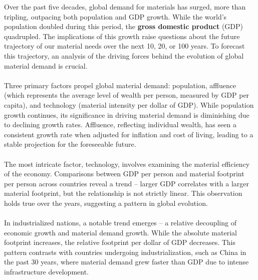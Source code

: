 \documentclass[../summary.tex]{subfiles}
\begin{document}
Over the past five decades, global demand for materials has surged, more than tripling, outpacing both population and GDP growth. While the world's population doubled during this period, the \textbf{gross domestic product} (GDP) quadrupled. The implications of this growth raise questions about the future trajectory of our material needs over the next 10, 20, or 100 years. To forecast this trajectory, an analysis of the driving forces behind the evolution of global material demand is crucial.\\
\\
Three primary factors propel global material demand: population, affluence (which represents the average level of wealth per person, measured by GDP per capita), and technology (material intensity per dollar of GDP). While population growth continues, its significance in driving material demand is diminishing due to declining growth rates. Affluence, reflecting individual wealth, has seen a consistent growth rate when adjusted for inflation and cost of living, leading to a stable projection for the foreseeable future.\\
\\
The most intricate factor, technology, involves examining the material efficiency of the economy. Comparisons between GDP per person and material footprint per person across countries reveal a trend – larger GDP correlates with a larger material footprint, but the relationship is not strictly linear. This observation holds true over the years, suggesting a pattern in global evolution.\\
\\
In industrialized nations, a notable trend emerges – a relative decoupling of economic growth and material demand growth. While the absolute material footprint increases, the relative footprint per dollar of GDP decreases. This pattern contrasts with countries undergoing industrialization, such as China in the past 30 years, where material demand grew faster than GDP due to intense infrastructure development.\
\end{document}
